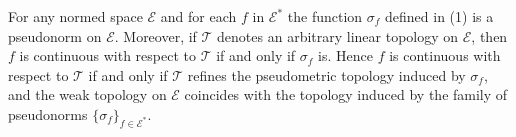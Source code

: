 For any normed space $\mathcal{E}$ and for each $f$ in $\mathcal{E}^*$ the function $\sigma_f$ defined in (1) is a pseudonorm on $\mathcal{E}$. Moreover, if $\mathcal{T}$ denotes an arbitrary linear topology on $\mathcal{E}$, then $f$ is continuous with respect to $\mathcal{T}$ if and only if $\sigma_f$ is. Hence $f$ is continuous with respect to $\mathcal{T}$ if and only if $\mathcal{T}$ refines the pseudometric topology induced by $\sigma_f$, and the weak topology on $\mathcal{E}$ coincides with the topology induced by the family of pseudonorms $\{\sigma_f\}_{f \in \mathcal{E}^*}$.
